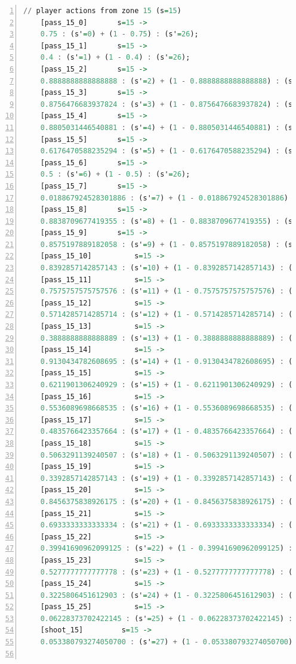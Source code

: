 \documentclass{l4proj}
\begin{document}
\begin{appendices}
\begin{lstlisting}[language=Haskell, numbers=left, caption=MDP used for strategy generation. This is the model specification as-is after the refinements at the end of chapter 3.]
	// player actions from zone 15 (s=15)
	[pass_15_0]	      s=15 ->
	0.75 : (s'=0) + (1 - 0.75) : (s'=26);
	[pass_15_1]	      s=15 ->
	0.4 : (s'=1) + (1 - 0.4) : (s'=26);
	[pass_15_2]	      s=15 ->
	0.8888888888888888 : (s'=2) + (1 - 0.8888888888888888) : (s'=26);
	[pass_15_3]	      s=15 ->
	0.8756476683937824 : (s'=3) + (1 - 0.8756476683937824) : (s'=26);
	[pass_15_4]	      s=15 ->
	0.8805031446540881 : (s'=4) + (1 - 0.8805031446540881) : (s'=26);
	[pass_15_5]	      s=15 ->
	0.6176470588235294 : (s'=5) + (1 - 0.6176470588235294) : (s'=26);
	[pass_15_6]	      s=15 ->
	0.5 : (s'=6) + (1 - 0.5) : (s'=26);
	[pass_15_7]	      s=15 ->
	0.018867924528301886 : (s'=7) + (1 - 0.018867924528301886) : (s'=26);
	[pass_15_8]	      s=15 ->
	0.8838709677419355 : (s'=8) + (1 - 0.8838709677419355) : (s'=26);
	[pass_15_9]	      s=15 ->
	0.8575197889182058 : (s'=9) + (1 - 0.8575197889182058) : (s'=26);
	[pass_15_10]	      s=15 ->
	0.8392857142857143 : (s'=10) + (1 - 0.8392857142857143) : (s'=26);
	[pass_15_11]	      s=15 ->
	0.7575757575757576 : (s'=11) + (1 - 0.7575757575757576) : (s'=26);
	[pass_15_12]	      s=15 ->
	0.5714285714285714 : (s'=12) + (1 - 0.5714285714285714) : (s'=26);
	[pass_15_13]	      s=15 ->
	0.3888888888888889 : (s'=13) + (1 - 0.3888888888888889) : (s'=26);
	[pass_15_14]	      s=15 ->
	0.9130434782608695 : (s'=14) + (1 - 0.9130434782608695) : (s'=26);
	[pass_15_15]	      s=15 ->
	0.6211901306240929 : (s'=15) + (1 - 0.6211901306240929) : (s'=26);
	[pass_15_16]	      s=15 ->
	0.5536089698668535 : (s'=16) + (1 - 0.5536089698668535) : (s'=26);
	[pass_15_17]	      s=15 ->
	0.4835766423357664 : (s'=17) + (1 - 0.4835766423357664) : (s'=26);
	[pass_15_18]	      s=15 ->
	0.5063291139240507 : (s'=18) + (1 - 0.5063291139240507) : (s'=26);
	[pass_15_19]	      s=15 ->
	0.3392857142857143 : (s'=19) + (1 - 0.3392857142857143) : (s'=26);
	[pass_15_20]	      s=15 ->
	0.8456375838926175 : (s'=20) + (1 - 0.8456375838926175) : (s'=26);
	[pass_15_21]	      s=15 ->
	0.6933333333333334 : (s'=21) + (1 - 0.6933333333333334) : (s'=26);
	[pass_15_22]	      s=15 ->
	0.39941690962099125 : (s'=22) + (1 - 0.39941690962099125) : (s'=26);
	[pass_15_23]	      s=15 ->
	0.5277777777777778 : (s'=23) + (1 - 0.5277777777777778) : (s'=26);
	[pass_15_24]	      s=15 ->
	0.3225806451612903 : (s'=24) + (1 - 0.3225806451612903) : (s'=26);
	[pass_15_25]	      s=15 ->
	0.06228373702422145 : (s'=25) + (1 - 0.06228373702422145) : (s'=26);
	[shoot_15]	       s=15 ->
	0.053380793274050700 : (s'=27) + (1 - 0.053380793274050700) : (s'=26);


\end{lstlisting}
\end{appendices}
\end{document}
